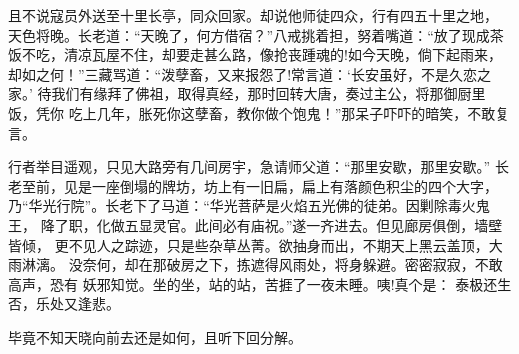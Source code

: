 且不说寇员外送至十里长亭，同众回家。却说他师徒四众，行有四五十里之地，
天色将晚。长老道：“天晚了，何方借宿？”八戒挑着担，努着嘴道：“放了现成茶
饭不吃，清凉瓦屋不住，却要走甚么路，像抢丧踵魂的!如今天晚，倘下起雨来，
却如之何！”三藏骂道：“泼孽畜，又来报怨了!常言道：‘长安虽好，不是久恋之家。’
待我们有缘拜了佛祖，取得真经，那时回转大唐，奏过主公，将那御厨里饭，凭你
吃上几年，胀死你这孽畜，教你做个饱鬼！”那呆子吓吓的暗笑，不敢复言。

行者举目遥观，只见大路旁有几间房宇，急请师父道：“那里安歇，那里安歇。”
长老至前，见是一座倒塌的牌坊，坊上有一旧扁，扁上有落颜色积尘的四个大字，
乃“华光行院”。长老下了马道：“华光菩萨是火焰五光佛的徒弟。因剿除毒火鬼王，
降了职，化做五显灵官。此间必有庙祝。”遂一齐进去。但见廊房俱倒，墙壁皆倾，
更不见人之踪迹，只是些杂草丛菁。欲抽身而出，不期天上黑云盖顶，大雨淋漓。
没奈何，却在那破房之下，拣遮得风雨处，将身躲避。密密寂寂，不敢高声，恐有
妖邪知觉。坐的坐，站的站，苦捱了一夜未睡。咦!真个是：
泰极还生否，乐处又逢悲。

毕竟不知天晓向前去还是如何，且听下回分解。